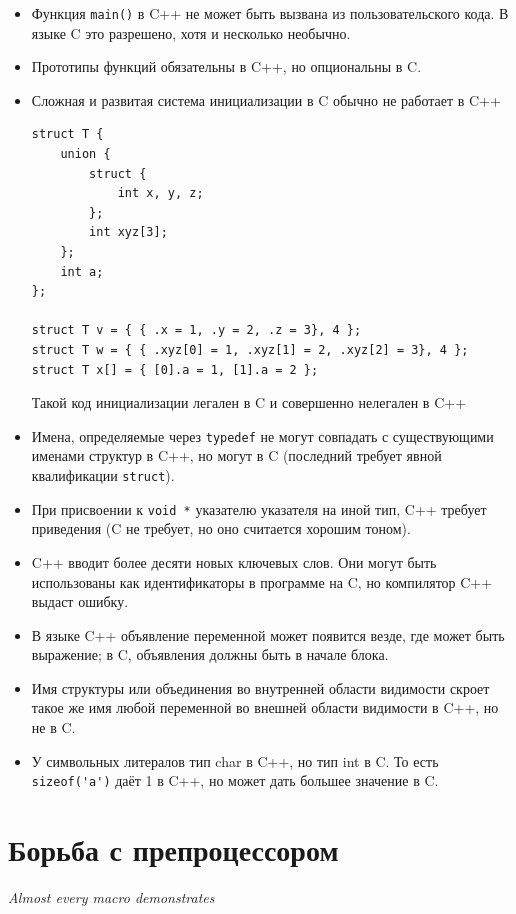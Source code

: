 \documentclass[a4paper,12pt,oneside]{book}
\begin{document}
\begin{itemize}
\item
Функция \lstinline!main()! в C++ не может быть вызвана из пользовательского кода. В языке C это разрешено, хотя и несколько необычно.
\item
Прототипы функций обязательны в C++, но опциональны в C.
\item
Сложная и развитая система инициализации в C обычно не работает в C++

\begin{lstlisting}
struct T {
    union {
        struct {
            int x, y, z;
        };
        int xyz[3];
    };
    int a;
};

struct T v = { { .x = 1, .y = 2, .z = 3}, 4 };
struct T w = { { .xyz[0] = 1, .xyz[1] = 2, .xyz[2] = 3}, 4 };
struct T x[] = { [0].a = 1, [1].a = 2 };
\end{lstlisting}

Такой код инициализации легален в C и совершенно нелегален в C++
\item
Имена, определяемые через \lstinline!typedef! не могут совпадать с существующими именами структур в C++, но могут в C (последний требует явной квалификации \lstinline!struct!).
\item
При присвоении к \lstinline!void *! указателю указателя на иной тип, C++ требует приведения (C не требует, но оно считается хорошим тоном).
\item
C++ вводит более десяти новых ключевых слов. Они могут быть использованы как идентификаторы в программе на C, но компилятор C++ выдаст ошибку.
\item
В языке C++ объявление переменной может появится везде, где может быть выражение; в C, объявления должны быть в начале блока.
\item
Имя структуры или объединения во внутренней области видимости скроет такое же имя любой переменной во внешней области видимости в C++, но не в C.
\item
У символьных литералов тип char в C++, но тип int в C. То есть \lstinline!sizeof('a')! даёт 1 в C++, но может дать большее значение в C.
\end{itemize}

\pagebreak
\section{Борьба с препроцессором}

\hfill\textit{Almost every macro demonstrates}
\end{document}
